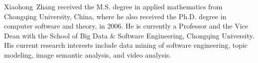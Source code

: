 \documentclass[journal]{IEEEtran}
\begin{document}
\begin{IEEEbiography}{Xiaohong~Zhang}
    received the M.S. degree in applied mathematics from Chongqing University, China, where he also received the Ph.D. degree in computer software and theory, in 2006. He is currently a Professor and the Vice Dean with the School of Big Data \& Software Engineering, Chongqing University. His current research interests include data mining of software engineering, topic modeling, image semantic analysis, and video analysis.
\end{IEEEbiography}
\vspace{-0.5cm}








\end{document}
